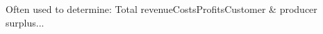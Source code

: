 \documentclass[preview]{standalone}
\begin{document}
\begin{center}
Often used to determine: Total revenueCostsProfitsCustomer & producer surplus...
\end{center}
\end{document}
